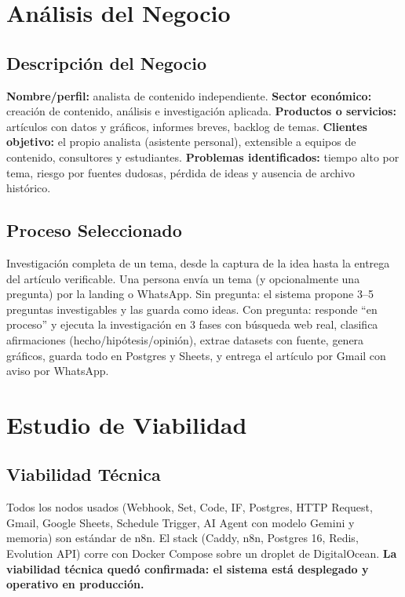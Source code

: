 \documentclass[11pt,a4paper]{article}
\begin{document}
\section{Análisis del Negocio}
\subsection{Descripción del Negocio}
\textbf{Nombre/perfil:} analista de contenido independiente. \textbf{Sector económico:} creación de contenido, análisis e investigación aplicada. \textbf{Productos o servicios:} artículos con datos y gráficos, informes breves, backlog de temas. \textbf{Clientes objetivo:} el propio analista (asistente personal), extensible a equipos de contenido, consultores y estudiantes. \textbf{Problemas identificados:} tiempo alto por tema, riesgo por fuentes dudosas, pérdida de ideas y ausencia de archivo histórico.

\subsection{Proceso Seleccionado}
Investigación completa de un tema, desde la captura de la idea hasta la entrega del artículo verificable. Una persona envía un tema (y opcionalmente una pregunta) por la landing o WhatsApp. Sin pregunta: el sistema propone 3--5 preguntas investigables y las guarda como ideas. Con pregunta: responde ``en proceso'' y ejecuta la investigación en 3 fases con búsqueda web real, clasifica afirmaciones (hecho/hipótesis/opinión), extrae datasets con fuente, genera gráficos, guarda todo en Postgres y Sheets, y entrega el artículo por Gmail con aviso por WhatsApp.

\section{Estudio de Viabilidad}
\subsection{Viabilidad Técnica}
Todos los nodos usados (Webhook, Set, Code, IF, Postgres, HTTP Request, Gmail, Google Sheets, Schedule Trigger, AI Agent con modelo Gemini y memoria) son estándar de n8n. El stack (Caddy, n8n, Postgres 16, Redis, Evolution API) corre con Docker Compose sobre un droplet de DigitalOcean. \textbf{La viabilidad técnica quedó confirmada: el sistema está desplegado y operativo en producción.}
\end{document}
